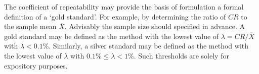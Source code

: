 \documentclass[12pt, a4paper]{report}
\theoremstyle{plain}
\theoremstyle{definition}
\theoremstyle{remark}
\begin{document}
	
	The coefficient of repeatability may provide the basis of formulation a formal definition of a `gold standard'. For example, by determining the ratio of $CR$ to the sample mean $\bar{X}$. Advisably the sample size should specified in advance. A gold standard may be defined as the method with the lowest value of $\lambda = CR /\bar{X}$ with $\lambda < 0.1\%$. Similarly, a silver standard may be defined as the method with the lowest value of $\lambda $ with $0.1\% \leq \lambda < 1\%$. Such thresholds are solely for expository purposes.

%
%
%	
%
%
%		
%	
%	
	

	


	
	

	
	
\end{document}

